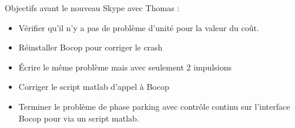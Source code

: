 \documentclass[fleqn,%
a4paper,11pt]{scrbook}
\begin{document}
Objectifs avant le nouveau Skype avec Thomas :
	\begin{itemize}
		\item Vérifier qu'il n'y a pas de problème d'unité pour la valeur du coût.
		\item Réinstaller Bocop pour corriger le crash
		\item Écrire le même problème mais avec seulement 2 impulsions
		\item Corriger le script matlab d'appel à Bocop
		\item Terminer le problème de phase parking avec contrôle continu sur l'interface Bocop pour via un script matlab. 
	\end{itemize}
\end{document}
